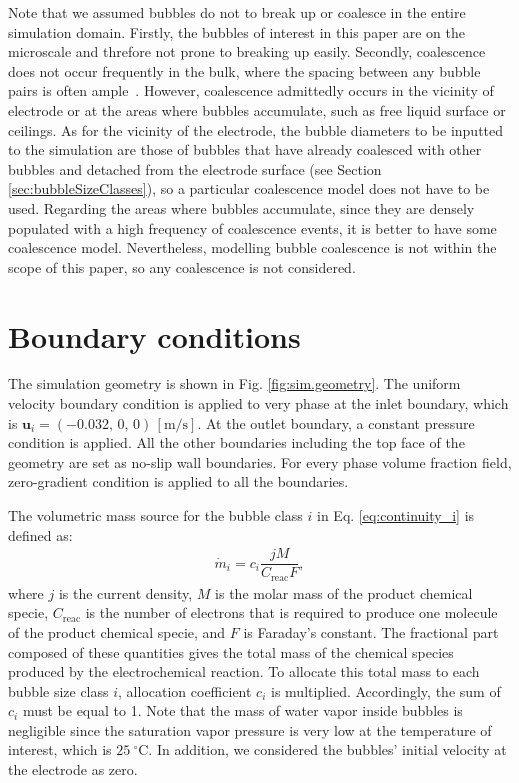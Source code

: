 \documentclass[3p, twocolumn, 10pt]{elsarticle}
\begin{document}
Note that we assumed bubbles do not to break up or coalesce in the entire simulation domain.
Firstly, the bubbles of interest in this paper are on the microscale and threfore not prone to breaking up easily.
Secondly, coalescence does not occur frequently in the bulk, where the spacing between any bubble pairs is often ample~\cite{hreizElectrogeneratedBubblesInduced2015,leeMicrofabricatedElectrolyticMicrobubblers2005}.
However, coalescence admittedly occurs in the vicinity of electrode or at the areas where bubbles accumulate, such as free liquid surface or ceilings.
As for the vicinity of the electrode, the bubble diameters to be inputted to the simulation are those of bubbles that have already coalesced with other bubbles and detached from the electrode surface (see Section \ref{sec:bubbleSizeClasses}), so a particular coalescence model does not have to be used.
Regarding the areas where bubbles accumulate, since they are densely populated with a high frequency of coalescence events, it is better to have some coalescence model.
Nevertheless, modelling bubble coalescence is not within the scope of this paper, so any coalescence is not considered.

\section{Boundary conditions}\label{sec:boundaryConditions}
The simulation geometry is shown in Fig. \ref{fig:sim.geometry}.
The uniform velocity boundary condition is applied to very phase at the inlet boundary, which is $\bm{u}_{i}=(-0.032,\,0,\,0)\,\mathrm{[m/s]}$.
At the outlet boundary, a constant pressure condition is applied.
All the other boundaries including the top face of the geometry are set as no-slip wall boundaries.
For every phase volume fraction field, zero-gradient condition is applied to all the boundaries.

The volumetric mass source for the bubble class $i$ in Eq. \ref{eq:continuity_i} is defined as:
\begin{align}
  \dot{m}_{i}=
  c_{i}\dfrac{jM}{C_{\mathrm{reac}}F},
\end{align}
where $j$ is the current density, $M$ is the molar mass of the product chemical specie, $C_{\mathrm{reac}}$ is the number of electrons that is required to produce one molecule of the product chemical specie, and $F$ is Faraday's constant.
The fractional part composed of these quantities gives the total mass of the chemical species produced by the electrochemical reaction.
To allocate this total mass to each bubble size class $i$, allocation coefficient $c_{i}$ is multiplied.
Accordingly, the sum of $c_{i}$ must be equal to 1.
Note that the mass of water vapor inside bubbles is negligible since the saturation vapor pressure is very low at the temperature of interest, which is $25\ ^\circ\mathrm{C}$. In addition, we considered the bubbles' initial velocity at the electrode as zero.
\end{document}
